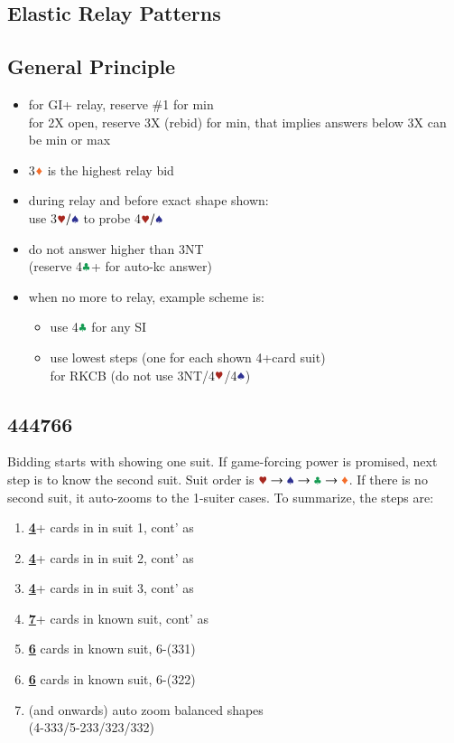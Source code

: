 \documentclass{article}
\begin{document}
\begin{multicols}{2}
\section{Elastic Relay Patterns}

\subsection{General Principle}
\begin{itemize}
    \item for GI+ relay, reserve \#1 for min \\
        for 2X open, reserve 3X (rebid) for min,
        that implies answers below 3X can be min or max
    \item 3$\ddd$ is the highest relay bid
    \item during relay and before exact shape shown: \\
        use 3$\hhh/\sss$ to probe 4$\hhh/\sss$
    \item do not answer higher than 3NT \\
        (reserve 4$\ccc$+ for auto-kc answer)
    \item when no more to relay, example scheme is:
    \begin{itemize}
        \item use 4$\ccc$ for any SI
        \item use lowest steps (one for each shown 4+card suit) \\
            for RKCB (do not use 3NT/4$\hhh$/4$\sss$)
    \end{itemize}
\end{itemize}

\subsection{444766}\label{sec:444766}
Bidding starts with showing one suit. If game-forcing power is promised, next step is to know the second suit.
Suit order is $\hhh \rightarrow \sss \rightarrow \ccc \rightarrow \ddd$. If there is no second suit, it auto-zooms to the 1-suiter cases. To summarize, the steps are:

\begin{enumerate}
    \item \textbf{\underline{4}}+ cards in in suit 1, cont' as 
    \item \textbf{\underline{4}}+ cards in in suit 2, cont' as
    \item \textbf{\underline{4}}+ cards in in suit 3, cont' as
    \item \textbf{\underline{7}}+ cards in known suit, cont' as
    \item \textbf{\underline{6}} cards in known suit, 6-(331)
    \item \textbf{\underline{6}} cards in known suit, 6-(322)
    \item (and onwards) auto zoom balanced shapes \\
        (4-333/5-233/323/332)
\end{enumerate}


\end{multicols}
\end{document}
